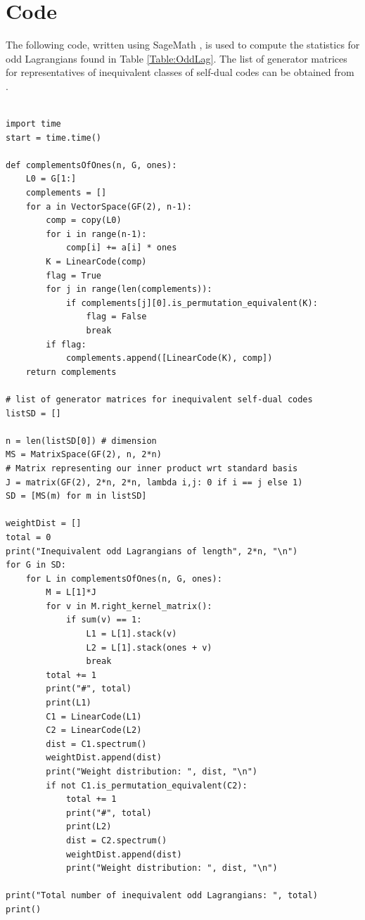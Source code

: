 \documentclass[a4paper,reqno]{amsart}
\theoremstyle{definition}
\theoremstyle{remark} \newtheorem{remark}[theorem]{Remark}
\numberwithin{equation}{section}
\begin{document}
\appendix

\section{Code} \label{code}

The following code, written using SageMath \cite{sage}, is used to compute the statistics for odd Lagrangians found in Table \ref{Table:OddLag}. The list of generator matrices for representatives of inequivalent classes of self-dual codes can be obtained from \cite{database}.

\begin{verbatim}

import time
start = time.time()

def complementsOfOnes(n, G, ones): 
    L0 = G[1:] 
    complements = [] 
    for a in VectorSpace(GF(2), n-1):
        comp = copy(L0)
        for i in range(n-1):
            comp[i] += a[i] * ones
        K = LinearCode(comp)
        flag = True
        for j in range(len(complements)):
            if complements[j][0].is_permutation_equivalent(K):
                flag = False
                break
        if flag:
            complements.append([LinearCode(K), comp])
    return complements

# list of generator matrices for inequivalent self-dual codes
listSD = []

n = len(listSD[0]) # dimension
MS = MatrixSpace(GF(2), n, 2*n)
# Matrix representing our inner product wrt standard basis
J = matrix(GF(2), 2*n, 2*n, lambda i,j: 0 if i == j else 1) 
SD = [MS(m) for m in listSD]

weightDist = []
total = 0
print("Inequivalent odd Lagrangians of length", 2*n, "\n")
for G in SD:
    for L in complementsOfOnes(n, G, ones):
        M = L[1]*J
        for v in M.right_kernel_matrix():
            if sum(v) == 1:
                L1 = L[1].stack(v)
                L2 = L[1].stack(ones + v)
                break
        total += 1
        print("#", total)
        print(L1)
        C1 = LinearCode(L1)
        C2 = LinearCode(L2)
        dist = C1.spectrum()
        weightDist.append(dist)
        print("Weight distribution: ", dist, "\n")
        if not C1.is_permutation_equivalent(C2):
            total += 1
            print("#", total)
            print(L2)
            dist = C2.spectrum()
            weightDist.append(dist)
            print("Weight distribution: ", dist, "\n")

print("Total number of inequivalent odd Lagrangians: ", total)
print()


\end{verbatim}
\end{document}
